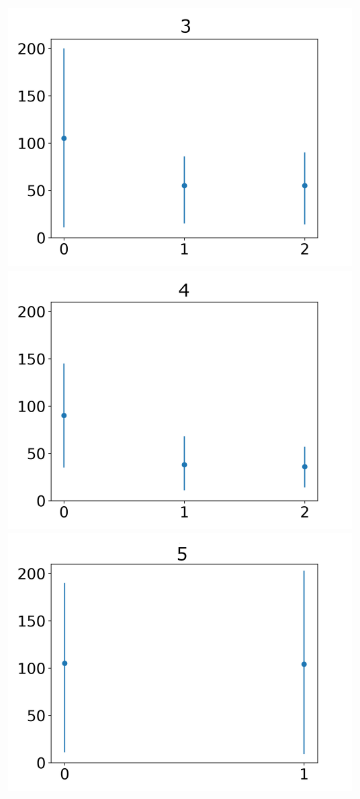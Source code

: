 \documentclass[journal]{IEEEtran}
\begin{document}
{{\begin{figure}[h!]
\begin{subfigure}{0.5\textwidth}
\centering
\includegraphics[scale=0.27]{Images/Average_steps/c.png}
 \includegraphics[scale=0.27]{Images/Average_steps/d.png}
 \centering
  \includegraphics[scale=0.27]{Images/Average_steps/e.png}

\end{subfigure}
\end{figure}}}
\end{document}
